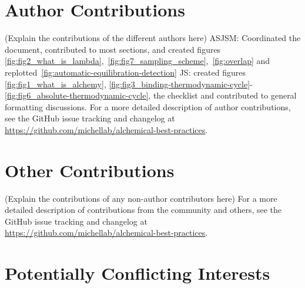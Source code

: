 \documentclass[9pt,bestpractices]{livecoms}
\newcommand{\githubrepository}{\url{https://github.com/michellab/alchemical-best-practices}}  %
\begin{document}
\section*{Author Contributions}
%
(Explain the contributions of the different authors here)
ASJSM: Coordinated the document, contributed to most sections, and created figures \ref{fig:fig2_what_is_lambda},~\ref{fig:fig7_sampling_scheme},~\ref{fig:overlap} and replotted~\ref{fig:automatic-equilibration-detection} 
JS: created figures \ref{fig:fig1_what_is_alchemy}, \ref{fig:fig3_binding-thermodynamic-cycle}-\ref{fig:fig6_absolute-thermodynamic-cycle}, the checklist and contributed to general formatting discussions. 
For a more detailed description of author contributions,
see the GitHub issue tracking and changelog at \githubrepository.

\section*{Other Contributions}
%

(Explain the contributions of any non-author contributors here)
For a more detailed description of contributions from the community and others, see the GitHub issue tracking and changelog at \githubrepository.



\section*{Potentially Conflicting Interests}
\end{document}
